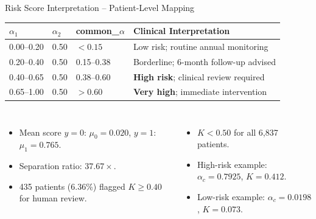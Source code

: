 \documentclass[aspectratio=169]{beamer}
\begin{document}
\begin{frame}{Risk Score Interpretation -- Patient-Level Mapping}
  \begin{center}\small
  \begin{tabular}{@{}p{2.2cm}p{1.8cm}p{2.4cm}p{4.8cm}@{}}
    \toprule
    \textbf{$\alpha_1$} & \textbf{$\alpha_2$} &
    \textbf{common\_$\alpha$} & \textbf{Clinical Interpretation} \\
    \midrule
    0.00--0.20 & 0.50 & ${<}0.15$    & Low risk; routine annual monitoring \\
    0.20--0.40 & 0.50 & 0.15--0.38   & Borderline; 6-month follow-up advised \\
    0.40--0.65 & 0.50 & 0.38--0.60   & \textbf{High risk}; clinical review required \\
    0.65--1.00 & 0.50 & ${>}0.60$    & \textbf{Very high}; immediate intervention \\
    \bottomrule
  \end{tabular}
  \end{center}
  \begin{columns}[T]
      \begin{itemize}\small
        \item Mean score $y{=}0$: $\mu_0{=}0.020$,
              $y{=}1$: $\mu_1{=}0.765$.
        \item Separation ratio: $37.67\times$.
        \item 435 patients (6.36\%) flagged
              $K{\geq}0.40$ for human review.
      \end{itemize}
      \begin{itemize}\small
        \item $K{<}0.50$ for all 6,837 patients.
        \item High-risk example: $\alpha_c{=}0.7925$, $K{=}0.412$.
        \item Low-risk example: $\alpha_c{=}0.0198$, $K{=}0.073$.
      \end{itemize}
  \end{columns}
\end{frame}
\end{document}

